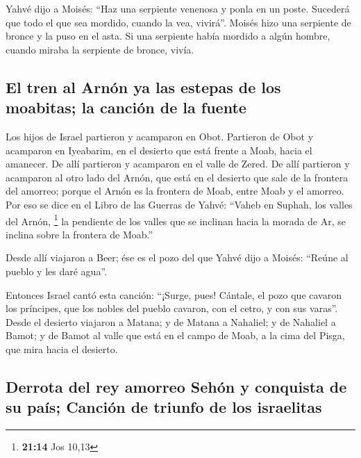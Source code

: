 \begin{paracol}{2}
 Yahvé dijo a Moisés: ``Haz una serpiente venenosa y ponla
en un poste. Sucederá que todo el que sea mordido, cuando la vea,
vivirá''.  Moisés hizo una serpiente de bronce y la puso
en el asta. Si una serpiente había mordido a algún hombre, cuando miraba
la serpiente de bronce, vivía.

\hypertarget{el-tren-al-arnuxf3n-ya-las-estepas-de-los-moabitas-la-canciuxf3n-de-la-fuente}{%
\subsection{El tren al Arnón ya las estepas de los moabitas; la canción
de la
fuente}\label{el-tren-al-arnuxf3n-ya-las-estepas-de-los-moabitas-la-canciuxf3n-de-la-fuente}}

 Los hijos de Israel partieron y acamparon en Obot.
 Partieron de Obot y acamparon en Iyeabarim, en el
desierto que está frente a Moab, hacia el amanecer.  De
allí partieron y acamparon en el valle de Zered.  De allí
partieron y acamparon al otro lado del Arnón, que está en el desierto
que sale de la frontera del amorreo; porque el Arnón es la frontera de
Moab, entre Moab y el amorreo.  Por eso se dice en el
Libro de las Guerras de Yahvé: ``Vaheb en Suphah, los valles del Arnón,
\footnote{\textbf{21:14} Jos 10,13}  la pendiente de los
valles que se inclinan hacia la morada de Ar, se inclina sobre la
frontera de Moab.''

 Desde allí viajaron a Beer; ése es el pozo del que Yahvé
dijo a Moisés: ``Reúne al pueblo y les daré agua''.

 Entonces Israel cantó esta canción: ``¡Surge, pues!
Cántale,  el pozo que cavaron los príncipes, que los
nobles del pueblo cavaron, con el cetro, y con sus varas''. Desde el
desierto viajaron a Matana;  y de Matana a Nahaliel; y de
Nahaliel a Bamot;  y de Bamot al valle que está en el
campo de Moab, a la cima del Pisga, que mira hacia el desierto.

\hypertarget{derrota-del-rey-amorreo-sehuxf3n-y-conquista-de-su-pauxeds-canciuxf3n-de-triunfo-de-los-israelitas}{%
\subsection{Derrota del rey amorreo Sehón y conquista de su país;
Canción de triunfo de los
israelitas}\label{derrota-del-rey-amorreo-sehuxf3n-y-conquista-de-su-pauxeds-canciuxf3n-de-triunfo-de-los-israelitas}}


\end{paracol}
